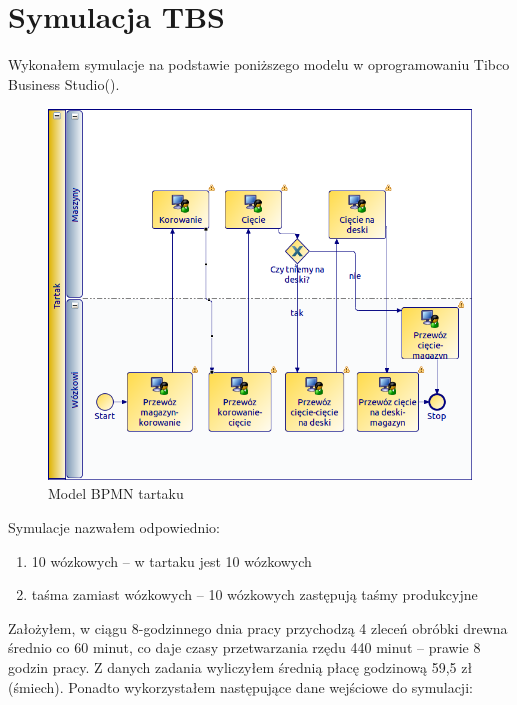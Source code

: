 \documentclass[a4paper]{article}
\begin{document}
\section{Symulacja TBS}
Wykonałem symulacje na podstawie poniższego modelu w oprogramowaniu Tibco Business Studio(\cite{tibco:000}).
\begin{figure}[H]
\centering
\includegraphics[scale=0.5]{img/diagram.png}
\caption{Model BPMN tartaku}
\label{img:diag}
\end{figure}
Symulacje nazwałem odpowiednio:
\begin{enumerate}
\item 10 wózkowych -- w tartaku jest 10 wózkowych
\item taśma zamiast wózkowych -- 10 wózkowych zastępują taśmy produkcyjne
\end{enumerate}
Założyłem, w ciągu 8-godzinnego dnia pracy przychodzą 4 zleceń obróbki drewna średnio co 60 minut, co daje czasy przetwarzania rzędu 440 minut -- prawie 8 godzin pracy. Z danych zadania wyliczyłem średnią płacę godzinową 59,5 zł (śmiech). Ponadto wykorzystałem następujące dane wejściowe do symulacji:
\end{document}
